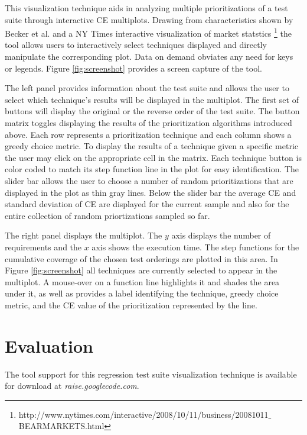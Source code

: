 \documentclass{vgtc}                          %
\begin{document}
This visualization technique aids in analyzing multiple prioritizations of a test suite through interactive CE multiplots.  Drawing from characteristics shown by Becker et al$.$ \cite{Stephen95visualizingnetwork} and a NY Times interactive visualization of market statstics \footnote[1]{http://www.nytimes.com/interactive/2008/10/11/business/20081011$\_$BEARMARKETS.html} the tool allows users to interactively select techniques displayed and directly manipulate the corresponding plot.  Data on demand obviates any need for keys or legends.  Figure \ref{fig:screenshot} provides a screen capture of the tool.  

The left panel provides information about the test suite and allows the user to select which technique's results will be displayed in the multiplot.  The first set of buttons will display the original or the reverse order of the test suite.  The button matrix toggles displaying the results of the prioritization algorithms introduced above.  Each row represents a prioritization technique and each column shows a greedy choice metric.  To display the results of a technique given a specific metric the user may click on the appropriate cell in the matrix.  Each technique button is color coded to match its step function line in the plot for easy identification.  The slider bar allows the user to choose a number of random prioritizations that are displayed in the plot as thin gray lines.  Below the slider bar the average CE and standard deviation of CE are displayed for the current sample and also for the entire collection of random priortizations sampled so far.

The right panel displays the multiplot.   The $y$ axis displays the number of requirements and the $x$ axis shows the execution time.  The step functions for the cumulative coverage of the chosen test orderings are plotted in this area.  In Figure \ref{fig:screenshot} all techniques are currently selected to appear in the multiplot.  A mouse-over on a function line highlights it and shades the area under it, as well as provides a label identifying the technique, greedy choice metric, and the CE value of the prioritization represented by the line.    

\section{Evaluation}

 The tool support for this regression test suite visualization technique is available for download at \textit{raise.googlecode.com}.
 
\end{document}
